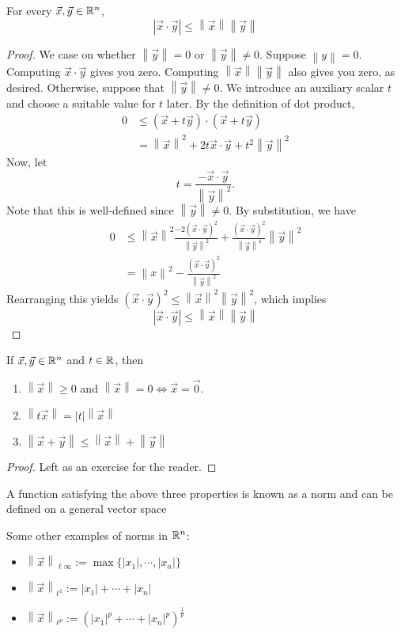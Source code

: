 \documentclass[11pt]{article}
\newcommand{\x}{\vec{x}}
\newcommand{\norm}[1]{\left\lVert #1 \right\rVert}
\newcommand{\y}{\vec{y}}
\begin{document}
\begin{theorem} 
    For every $\x, \y \in \R^n$, \[|\x \cdot \y | \leq \norm{\x}\norm{\y}\]
\end{theorem}

\begin{proof}
    We case on whether $\norm{\y} = 0$ or $\norm{\y} \neq 0$. \vspace{3mm}
    Suppose $\norm{y} = 0$. Computing $\x \cdot \y$ gives you zero. Computing $\norm{\x}\norm{\y}$ also gives you zero, as desired. \vspace{3mm}
    Otherwise, suppose that $\norm{\y} \neq 0$. We introduce an auxiliary scalar $t$ and choose a suitable value for $t$ later. By the definition of dot product, \begin{align}
        0 &\leq (\x + t\y) \cdot (\x + t\y) \\
        &= \norm{\x}^2 + 2t\x\cdot\y + t^2\norm{\y}^2 \end{align}
    Now, let 
    \[t = \frac{-\x\cdot\y}{\norm{\y}^2}.\]
    Note that this is well-defined since $\norm{\y} \neq 0$. By substitution, we have
    \begin{align} 0 &\leq \norm{\x}^2 \frac{-2(\x\cdot\y)^2}{\norm{\y}^2} + \frac{(\x\cdot\y)^2}{\norm{\y}^4}\norm{\y}^2 \\ &= \norm{x}^2 - \frac{(\x\cdot\y)^2}{\norm{\y}^2}\end{align}
    Rearranging this yields $(\x\cdot\y)^2 \leq \norm{\x}^2 \norm{\y}^2$, which implies
    \[|\x \cdot \y| \leq \norm{\x}\norm{\y}\]
\end{proof}
\begin{theorem}
    If $\x,\y \in \R^n$ and $t \in \mathbb{R}$, then \begin{enumerate}
        \item $\norm{\x} \geq 0$ and $\norm{\x} = 0 \iff \x = \vec{0}$. 
        \item $\norm{t\x} = |t|\norm{\x}$
        \item $\norm{\x + \y} \leq \norm{\x} + \norm{\y}$ \end{enumerate}
\end{theorem}
\begin{proof}
    Left as an exercise for the reader.
\end{proof}

\begin{remark}
    A function satisfying the above three properties is known as a norm and can be defined on a general vector space
\end{remark}
\begin{example}
    Some other examples of norms in $\mathbb{R}^n$: \begin{itemize}
        \item $\norm{\x}_{\ell \infty} := \max\{|x_1|, \cdots, |x_n|\}$
        \item $\norm{\x}_{\ell^1} := |x_1| + \cdots + |x_n|$
        \item $\norm{\x}_{\ell^p} := (|x_1|^p + \cdots + |x_n|^p)^\frac{1}{p}$ \end{itemize}
    \end{example}
\end{document}
